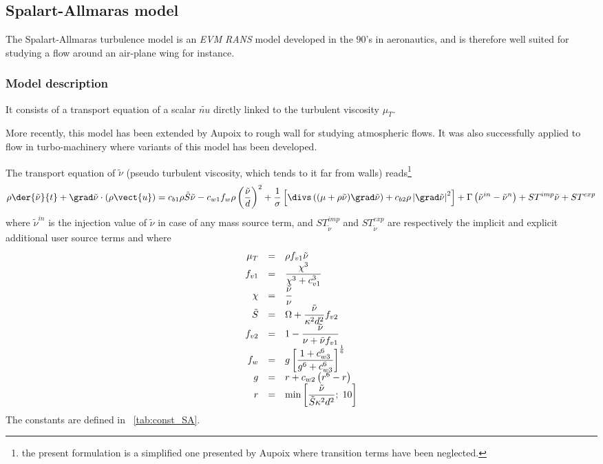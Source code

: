 \subsection{Spalart-Allmaras model}
The Spalart-Allmaras turbulence model \cite{Spalart:1994} is an \emph{EVM} \emph{RANS} model developed in the $90$'s in aeronautics, and is therefore well suited
for studying a flow around an air-plane wing for instance.

\subsubsection{Model description}
It consists of a transport equation of a scalar $\tilde{nu}$ dirctly linked to the turbulent viscosity $\mu_T$. 

More recently, this model has been extended by Aupoix \cite{Aupoix:2003} to rough wall for studying atmospheric flows. It was also successfully applied to flow in turbo-machinery where variants of this model has been developed. 

The transport equation of $\tilde{\nu}$ (pseudo turbulent viscosity, which tends to it far from walls) reads\footnote{
the present formulation is a simplified one presented by Aupoix \cite{Aupoix:2003} where transition terms have been neglected.
}
\begin{equation}\label{eq:turbul:SA_used}
\rho \der{\tilde{\nu}}{ t} + \grad \tilde{\nu} \cdot\left( \rho \vect{u} \right)
= c_{b1} \rho  \tilde{S} \tilde{\nu}
- c_{w1}f_{w} \rho \left( \dfrac{\tilde{\nu}}{d} \right)^2
+ \dfrac{1}{ \sigma} \left[ \divs \left( (\mu + \rho \tilde{\nu}) \grad \tilde{\nu} \right)
+ c_{b2} \rho \left| \grad \tilde{\nu} \right| ^2 
  \right]
  + \Gamma \left( \tilde{\nu}^{in} - \tilde{\nu}^n \right) +ST^{imp} \tilde{\nu} +ST^{exp}
\end{equation}
%
where $\tilde{\nu}^{in}$ is the injection value of $\tilde{\nu}$ in case of any mass source term, and $ST^{imp}_{\tilde{\nu}}$ and $ST^{exp}_{\tilde{\nu}}$ 
are respectively the implicit and explicit additional user source terms and
where
%
\begin{equation}\label{eq:def_fun_SA}
\begin{array}{ r c l}
\mu_T & =& \rho f_{v1} \tilde{\nu} \\
f_{v1} &=& \dfrac{\chi^3 }{\chi^3+ c_{v1}^3} \\
\chi & = & \dfrac{\tilde{\nu}}{ \nu} \\
\tilde{S} &=& \Omega + \dfrac{\tilde{\nu}}{ \kappa ^2 d^2} f_{v2} \\
f_{v2} &=& 1 - \dfrac{ \tilde{\nu}}{\nu + \tilde{\nu} f_{v1}} \\
f_w &=& g \left[ \dfrac{1+ c_{w3}^6 }{g^6+ c_{w3}^6} \right]^\frac{1}{6} \\
g &=& r +c_{w2} \left( r^6 -r \right) \\
r &=& \min \left[ \dfrac{ \tilde{\nu} }{ \tilde{S} \kappa^ 2 d^2 } ; \; 10 \right]
\end{array}
\end{equation}
%
The constants are defined in \tablename~\ref{tab:const_SA}.

